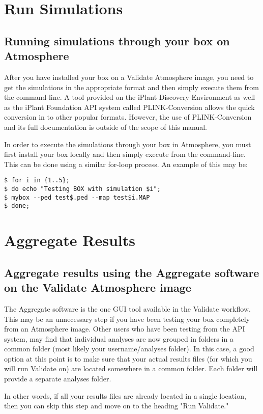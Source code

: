 \documentclass[twoside,a4paper]{refart}
\begin{document}
\section{Run Simulations}
\subsection{Running simulations through your box on Atmosphere}
After you have installed your box on a Validate Atmosphere image, you need to get the simulations in the appropriate format and then simply execute them from the command-line. A tool provided on the iPlant Discovery Environment as well as the iPlant Foundation API system called PLINK-Conversion allows the quick conversion in to other popular formats. However, the use of PLINK-Conversion and its full documentation is outside of the scope of this manual.

In order to execute the simulations through your box in Atmosphere, you must first install your box locally and then simply execute from the command-line. This can be done using a similar for-loop process. An example of this may be:

\begin{lstlisting}[frame=single]
$ for i in {1..5};
$ do echo "Testing BOX with simulation $i";
$ mybox --ped test$.ped --map test$i.MAP
$ done;
\end{lstlisting} 

\section{Aggregate Results}
\subsection{Aggregate results using the Aggregate software on the Validate Atmosphere image}

The Aggregate software is the one GUI tool available in the Validate workflow. This may be an unnecessary step if you have been testing your box completely from an Atmosphere image. Other users who have been testing from the API system, may find that individual analyses are now grouped in folders in a common folder (most likely your username/analyses folder). In this case, a good option at this point is to make sure that your actual results files (for which you will run Validate on) are located somewhere in a common folder. Each folder will provide a separate analyses folder. 

In other words, if all your results files are already located in a single location, then you can skip this step and move on to the heading "Run Validate."
\end{document}
